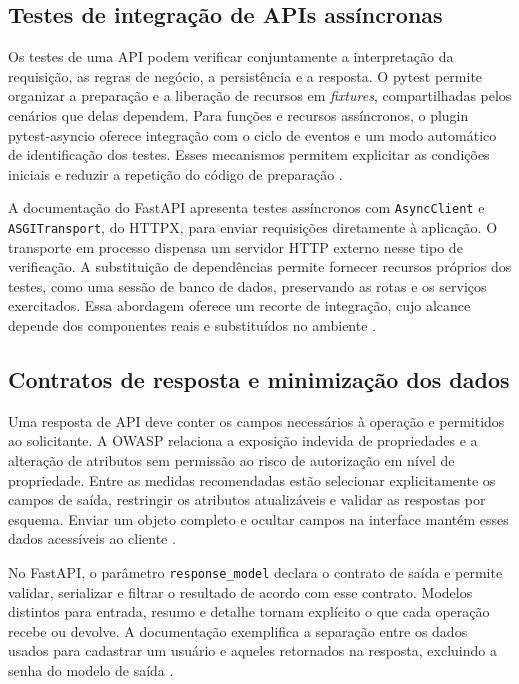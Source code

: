 \subsection{Testes de integração de APIs assíncronas}
\label{subsec:fundamentos-testes-api}

Os testes de uma API podem verificar conjuntamente a interpretação da requisição, as regras de negócio, a persistência e a resposta. O pytest permite organizar a preparação e a liberação de recursos em \textit{fixtures}, compartilhadas pelos cenários que delas dependem. Para funções e recursos assíncronos, o plugin pytest-asyncio oferece integração com o ciclo de eventos e um modo automático de identificação dos testes. Esses mecanismos permitem explicitar as condições iniciais e reduzir a repetição do código de preparação \cite{pytest2026fixtures,pytestasyncio2026}.

A documentação do FastAPI apresenta testes assíncronos com \texttt{AsyncClient} e \texttt{ASGITransport}, do HTTPX, para enviar requisições diretamente à aplicação. O transporte em processo dispensa um servidor HTTP externo nesse tipo de verificação. A substituição de dependências permite fornecer recursos próprios dos testes, como uma sessão de banco de dados, preservando as rotas e os serviços exercitados. Essa abordagem oferece um recorte de integração, cujo alcance depende dos componentes reais e substituídos no ambiente \cite{fastapi2026async,fastapi2026overrides}.

\subsection{Contratos de resposta e minimização dos dados}
\label{subsec:fundamentos-respostas-api}

Uma resposta de API deve conter os campos necessários à operação e permitidos ao solicitante. A OWASP relaciona a exposição indevida de propriedades e a alteração de atributos sem permissão ao risco de autorização em nível de propriedade. Entre as medidas recomendadas estão selecionar explicitamente os campos de saída, restringir os atributos atualizáveis e validar as respostas por esquema. Enviar um objeto completo e ocultar campos na interface mantém esses dados acessíveis ao cliente \cite{owasp2023propriedades}.

No FastAPI, o parâmetro \texttt{response\_model} declara o contrato de saída e permite validar, serializar e filtrar o resultado de acordo com esse contrato. Modelos distintos para entrada, resumo e detalhe tornam explícito o que cada operação recebe ou devolve. A documentação exemplifica a separação entre os dados usados para cadastrar um usuário e aqueles retornados na resposta, excluindo a senha do modelo de saída \cite{fastapi2026response}.

